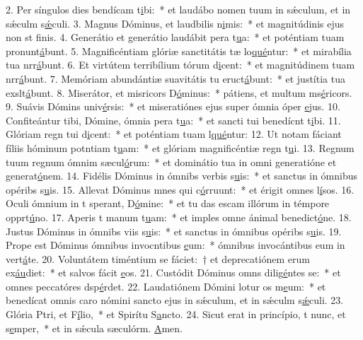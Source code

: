 2. Per síngulos dies bendícam t\uline{i}bi:~* et laudábo nomen tuum in sǽculum, et in sǽculm s\uline{ǽ}culi.
3. Magnus Dóminus, et laudbilis n\uline{i}mis:~* et magnitúdinis ejus non st f\uline{i}nis.
4. Generátio et generátio laudábit pera t\uline{u}a:~* et poténtiam tuam pronunt\uline{á}bunt.
5. Magnificéntiam glóriæ sanctitátis tæ lo\uline{qué}ntur:~* et mirabília tua nrr\uline{á}bunt.
6. Et virtútem terribílium tórum d\uline{i}cent:~* et magnitúdinem tuam nrr\uline{á}bunt.
7. Memóriam abundántiæ suavitátis tu eruct\uline{á}bunt:~* et justítia tua exslt\uline{á}bunt.
8. Miserátor, et misricors D\uline{ó}minus:~* pátiens, et multum ms\uline{é}ricors.
9. Suávis Dómins univ\uline{é}rsis:~* et miseratiónes ejus super ómnia óper \uline{e}jus.
10. Confiteántur tibi, Dómine, ómnia pera t\uline{u}a:~* et sancti tui benedícnt t\uline{i}bi.
11. Glóriam regn tui d\uline{i}cent:~* et poténtiam tuam l\uline{qué}ntur:
12. Ut notam fáciant fíliis hóminum potntiam t\uline{u}am:~* et glóriam magnificéntiæ regn t\uline{u}i.
13. Regnum tuum regnum ómnim sæcul\uline{ó}rum:~* et dominátio tua in omni generatióne et generat\uline{ó}nem.
14. Fidélis Dóminus in ómnibs verbis s\uline{u}is:~* et sanctus in ómnibus opéribs s\uline{u}is.
15. Allevat Dóminus mnes qui c\uline{ó}rruunt:~* et érigit omnes l\uline{í}sos.
16. Oculi ómnium in t sperant, D\uline{ó}mine:~* et tu das escam illórum in témpore opprt\uline{ú}no.
17. Aperis t manum t\uline{u}am:~* et imples omne ánimal benedict\uline{ó}ne.
18. Justus Dóminus in ómnibs viis s\uline{u}is:~* et sanctus in ómnibus opéribs s\uline{u}is.
19. Prope est Dóminus ómnibus invocntibus \uline{e}um:~* ómnibus invocántibus eum in vert\uline{á}te.
20. Voluntátem timéntium se fáciet:~† et deprecatiónem erum ex\uline{áu}diet:~* et salvos fácit \uline{e}os.
21. Custódit Dóminus omns dilig\uline{é}ntes se:~* et omnes peccatóres dsp\uline{é}rdet.
22. Laudatiónem Dómini lotur os m\uline{e}um:~* et benedícat omnis caro nómini sancto ejus in sǽculum, et in sǽculm s\uline{ǽ}culi.
23. Glória Ptri, et F\uline{í}lio,~* et Spirítu S\uline{a}ncto.
24. Sicut erat in princípio, t nunc, et s\uline{e}mper,~* et in sǽcula sæculórm. \uline{A}men.

